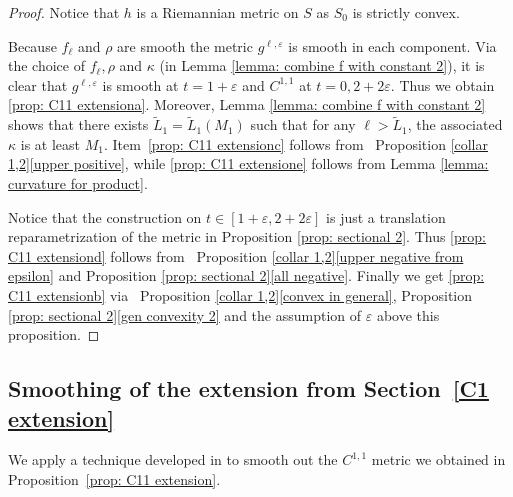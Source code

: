 \documentclass[10pt]{amsart}
\theoremstyle{definition}
\let\eps\varepsilon
\renewcommand{\>}{{\rangle}}
\newcommand{\<}{{\langle}}
\begin{document}
\begin{proof}
Notice that $h$ is a Riemannian metric on $S$ as $S_0$ is strictly convex.

Because $f_\ell$ and $\rho$ are smooth the metric $g^{\ell,\eps}$ is smooth in each component. Via the choice of $f_\ell, \rho$ and $\kappa$ (in Lemma \ref{lemma: combine f with constant 2}), it is clear that $g^{\ell,\eps}$ is smooth at $t=1+\eps$ and $C^{1,1}$ at $t=0, 2+2\eps$. Thus we obtain \eqref{prop: C11 extensiona}. Moreover, Lemma \ref{lemma: combine f with constant 2} shows that there exists $\tilde{L}_1=\tilde{L}_1(M_1)$ such that for any $\ell>\tilde{L}_1$, the associated $\kappa$ is at least $M_1$.
Item~\eqref{prop: C11 extensionc} follows from ~Proposition \ref{collar 1,2}\eqref{upper positive}, while \eqref{prop: C11 extensione} follows from Lemma \ref{lemma: curvature for product}.

Notice that the construction on $t\in[1+\eps,2+2\eps]$ is just a translation reparametrization of the metric in Proposition \ref{prop: sectional 2}. Thus \eqref{prop: C11 extensiond} follows from ~Proposition \ref{collar 1,2}\eqref{upper negative from epsilon} and Proposition \ref{prop: sectional 2}\eqref{all negative}. Finally we get \eqref{prop: C11 extensionb} via ~Proposition \ref{collar 1,2}\eqref{convex in general}, Proposition \ref{prop: sectional 2}\eqref{gen convexity 2} and the assumption of $\eps$ above this proposition.
\end{proof}

\subsection{Smoothing of the extension from Section~\ref{C1 extension}}\label{smooth extension}

We apply a technique developed in \cite{EK19} to smooth out the $C^{1,1}$ metric we obtained in Proposition~\ref{prop: C11 extension}.
\end{document}
